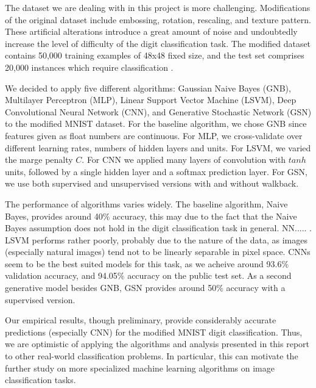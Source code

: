 \documentclass{acm_proc_article-sp}
\begin{document}
The dataset we are dealing with in this project is more challenging. Modifications of the original dataset include embossing, rotation, rescaling, and texture pattern. These artificial alterations introduce a great amount of noise and undoubtedly increase the  level of difficulty of the digit classification task. The modified dataset contains 50,000 training examples of 48x48 fixed size, and the test set comprises 20,000 instances which require classification \cite{comp598p3}.

We decided to apply five different algorithms: Gaussian Naive Bayes (GNB), Multilayer Perceptron (MLP), Linear Support Vector Machine (LSVM), Deep Convolutional Neural Network (CNN), and Generative Stochastic Network (GSN) to the modified MNIST dataset. For the baseline algorithm, we chose GNB since features given as float numbers are continuous. For MLP, we cross-validate over different learning rates, numbers of hidden layers and units. For LSVM, we varied the marge penalty $C$.  For CNN we applied many layers of convolution with $tanh$ units, followed by a single hidden layer and a softmax prediction layer. For GSN, we use both supervised and unsupervised versions with and without walkback.

The performance of algorithms varies widely. The baseline algorithm, Naive Bayes, provides around 40$\%$ accuracy, this may due to the fact that the Naive Bayes assumption does not hold in the digit classification task in general. NN..... . LSVM performs rather poorly, probably due to the nature of the data, as images (especially natural images) tend not to be linearly separable in pixel space. CNNs seem to be the best suited models for this task, as we acheive around 93.6$\%$ validation accuracy, and 94.05$\%$ accuracy on the public test set. As a second generative model besides GNB, GSN provides around 50$\%$ accuracy with a supervised version.

Our empirical results, though preliminary, provide considerably accurate predictions (especially CNN) for the modified MNIST digit classification. Thus, we are optimistic of applying the algorithms and analysis presented in this report to other real-world  classification problems. In particular, this can motivate the further study on more specialized machine learning algorithms on image classification tasks.




\end{document}
